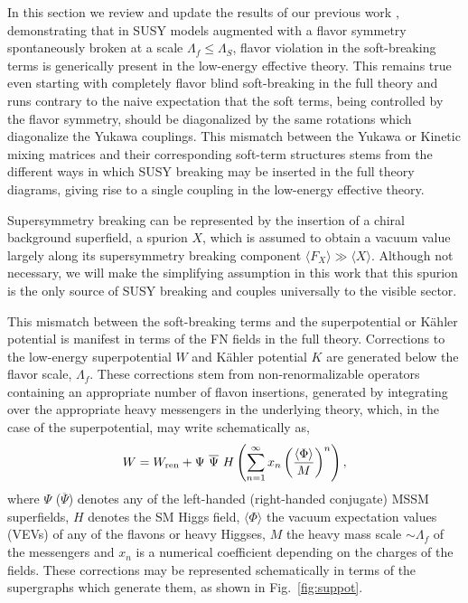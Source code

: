\documentclass[a4paper,11pt]{article}
\begin{document}
In this section we review and update the results of our previous work  \cite{Das:2016czs}, demonstrating that in SUSY models augmented with a flavor symmetry spontaneously broken at a scale $\Lambda_f \leq \Lambda_S$, flavor violation in the soft-breaking terms is generically present in the low-energy effective theory. This remains true even starting with completely flavor blind soft-breaking in the full theory and runs contrary to the naive expectation that the soft terms, being controlled by the flavor symmetry, should be diagonalized by the same rotations which diagonalize the Yukawa couplings.
This mismatch between the Yukawa or Kinetic mixing matrices and their corresponding soft-term structures stems from the different ways in which SUSY breaking may be inserted in the full theory diagrams, giving rise to a single coupling in the low-energy effective theory. 

Supersymmetry breaking can be represented by the insertion of a chiral background superfield, a spurion $X$, which is assumed to obtain a vacuum value largely along its supersymmetry breaking component $\langle F_X \rangle \gg \langle X \rangle$. Although not necessary, we will make the simplifying assumption in this work that this spurion is the only source of SUSY breaking and couples universally to the visible sector. 

This mismatch between the soft-breaking terms and the superpotential or K\"ahler potential is manifest in terms of the FN fields in the full theory. Corrections to the low-energy superpotential $W$ and K\"ahler potential $K$ are generated below the flavor scale, $\Lambda_f$. These corrections stem from non-renormalizable operators containing an appropriate number of flavon insertions, generated by integrating over the appropriate heavy messengers in the underlying theory, which, in the case of the superpotential, may write schematically as, 
\begin{equation} \label{eq:suppot}
W = W_{\rm ren} + \Psi ~ \overline \Psi~ H \left( \sum_{n=1}^{\infty} x_n \left(\frac{\langle \Phi \rangle }{M} \right)^n \right), 
\end{equation}
where $\Psi$ ($\overline \Psi$) denotes any of the left-handed (right-handed conjugate) MSSM superfields, $H$ denotes the SM Higgs field, $\langle \Phi \rangle $ the vacuum expectation values (VEVs) of any of the flavons or heavy Higgses, $M$ the heavy mass scale $\sim \Lambda_f$ of the messengers and $x_n$ is a numerical coefficient depending on the charges of the fields. These corrections may be represented schematically in terms of the supergraphs which generate them, as shown in Fig.~\ref{fig:suppot}. 
\end{document}
